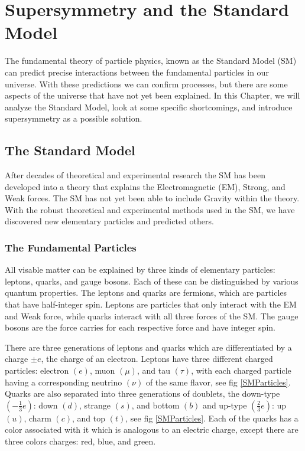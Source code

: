 \chapter{Supersymmetry and the Standard Model}
\label{ch:SUSY}

The fundamental theory of particle physics, known as the Standard Model (SM) can predict precise interactions between the fundamental particles in our universe. With these predictions we can confirm processes, but there are some aspects of the universe that have not yet been explained. In this Chapter, we will analyze the Standard Model, look at some specific shortcomings, and introduce supersymmetry as a possible solution.

\section{The Standard Model}
\label{sec:SM}

After decades of theoretical and experimental research the SM has been developed into a theory that explains the Electromagnetic (EM), Strong, and Weak forces. The SM has not yet been able to include Gravity within the theory. With the robust theoretical and experimental methods used in the SM, we have discovered new elementary particles and predicted others. 

\subsection{The Fundamental Particles}

 All visable matter can be explained by three kinds of elementary particles: leptons, quarks, and gauge bosons. Each of these can be distinguished by various quantum properties. The leptons and quarks are fermions, which are particles that have half-integer spin. Leptons are particles that only interact with the EM and Weak force, while quarks interact with all three forces of the SM. The gauge bosons are the force carries for each respective force and have integer spin. 
 
 There are three generations of leptons and quarks which are differentiated by a charge $\pm e$, the charge of an electron. Leptons have three different charged particles: electron $(e)$, muon $(\mu)$, and tau $(\tau)$, with each charged particle having a corresponding neutrino $(\nu)$ of the same flavor, see fig \ref{SMParticles}. Quarks are also separated into three generations of doublets, the down-type $(-\frac{1}{3}e)$: down $(d)$, strange $(s)$, and bottom $(b)$ and up-type $(\frac{2}{3}e)$: up $(u)$, charm $(c)$, and top $(t)$, see fig \ref{SMParticles}. Each of the quarks has a color associated with it which is analogous to an electric charge, except there are three colors charges: red, blue, and green.  

